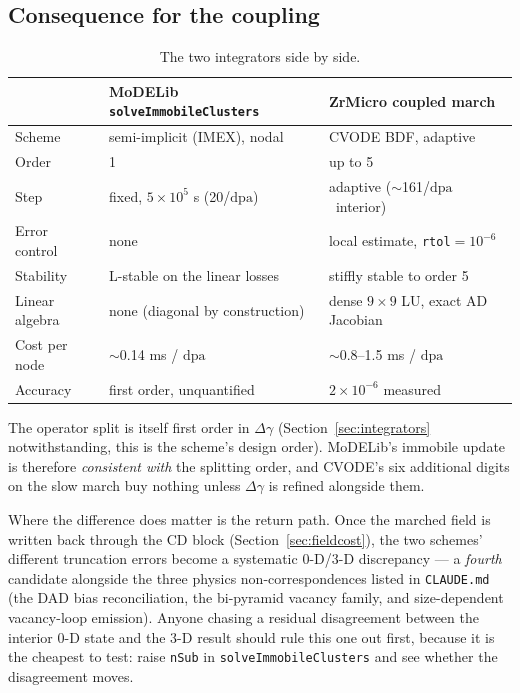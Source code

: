 \documentclass[11pt,a4paper]{article}
\newcommand{\code}[1]{\texttt{\small #1}}
\newcommand{\dpa}{\ensuremath{\mathrm{dpa}}}
\begin{document}
\subsection{Consequence for the coupling}

\begin{table}[htb]
\centering
\caption{The two integrators side by side.}
\begin{tabular}{lll}
\toprule
& MoDELib \code{solveImmobileClusters} & ZrMicro coupled march \\
\midrule
Scheme        & semi-implicit (IMEX), nodal & CVODE BDF, adaptive \\
Order         & 1 & up to 5 \\
Step          & fixed, $5\times10^{5}$ s (20/\dpa) & adaptive ($\sim$161/\dpa\ interior) \\
Error control & none & local estimate, \code{rtol}$=10^{-6}$ \\
Stability     & L-stable on the linear losses & stiffly stable to order 5 \\
Linear algebra& none (diagonal by construction) & dense $9\times9$ LU, exact AD Jacobian \\
Cost per node & $\sim$0.14 ms / \dpa & $\sim$0.8--1.5 ms / \dpa \\
Accuracy      & first order, unquantified & $2\times10^{-6}$ measured \\
\bottomrule
\end{tabular}
\end{table}

The operator split is itself first order in $\Delta\gamma$
(Section~\ref{sec:integrators} notwithstanding, this is the scheme's design
order). MoDELib's immobile update is therefore \emph{consistent with} the
splitting order, and CVODE's six additional digits on the slow march buy nothing
unless $\Delta\gamma$ is refined alongside them.

Where the difference does matter is the return path. Once the marched field is
written back through the CD block (Section~\ref{sec:fieldcost}), the two schemes'
different truncation errors become a systematic 0-D/3-D discrepancy --- a
\emph{fourth} candidate alongside the three physics non-correspondences listed in
\code{CLAUDE.md} (the DAD bias reconciliation, the bi-pyramid vacancy family, and
size-dependent vacancy-loop emission). Anyone chasing a residual disagreement
between the interior 0-D state and the 3-D result should rule this one out
first, because it is the cheapest to test: raise \code{nSub} in
\code{solveImmobileClusters} and see whether the disagreement moves.
\end{document}
